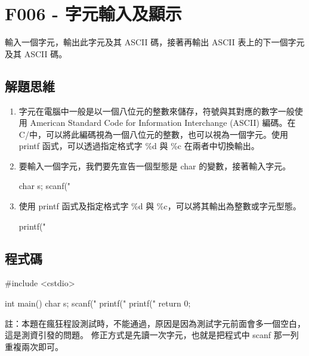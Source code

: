 \section{F006 - 字元輸入及顯示}
輸入一個字元，輸出此字元及其 ASCII 碼，接著再輸出 ASCII 表上的下一個字元及其 ASCII 碼。

\subsection{解題思維}
\begin{enumerate}
\item 字元在電腦中一般是以一個八位元的整數來儲存，符號與其對應的數字一般使用 American Standard Code for Information Interchange (ASCII) 編碼。在 C/\cc{}中，可以將此編碼視為一個八位元的整數，也可以視為一個字元。使用 printf 函式，可以透過指定格式字 \%d 與 \%c 在兩者中切換輸出。
\item 要輸入一個字元，我們要先宣告一個型態是 char 的變數，接著輸入字元。
	\begin{inside}
		char s;
		scanf("%
	\end{inside}
\item 使用 printf 函式及指定格式字 \%d 與 \%c，可以將其輸出為整數或字元型態。
	\begin{inside}
		printf("%
	\end{inside}
\end{enumerate}
\newpage
\subsection{程式碼}
\begin{cppcode}
	#include <cstdio>
	
	int main()
	{
		char s;
		scanf("%
		printf("%
		printf("%
		return 0;
	}
\end{cppcode}
註：本題在瘋狂程設測試時，不能通過，原因是因為測試字元前面會多一個空白，這是測資引發的問題。
修正方式是先讀一次字元，也就是把程式中 scanf 那一列重複兩次即可。
